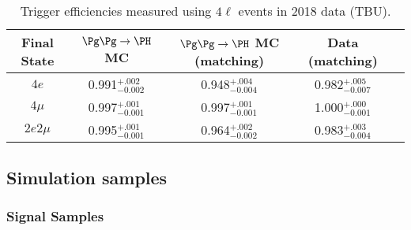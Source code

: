 \begin{table}[h]
	\centering
	\begin{tabular}{|c|c|c|c|c|} 
		\hline %
		Final State  & $\ggH$ MC & $\ggH$ MC (matching)  & Data (matching)   \\
		\hline %
		$4e$  & 0.991$^{+.002}_{-0.002}$ & 0.948$^{+.004}_{-0.004}$ & 0.982$^{+.005}_{-0.007}$ \\
		$4\mu$  & 0.997$^{+.001}_{-0.001}$ & 0.997$^{+.001}_{-0.001}$ & 1.000$^{+.000}_{-0.001}$ \\
		$2e2\mu$  & 0.995$^{+.001}_{-0.001}$ & 0.964$^{+.002}_{-0.002}$ & 0.983$^{+.003}_{-0.004}$ \\
		\hline %
	\end{tabular}
	\caption{
		Trigger efficiencies measured using $4\ell$ events in 2018 data (TBU).}
	\label{tab:TrigEffC}
\end{table}

\subsection{Simulation samples}

\subsubsection{Signal Samples}

